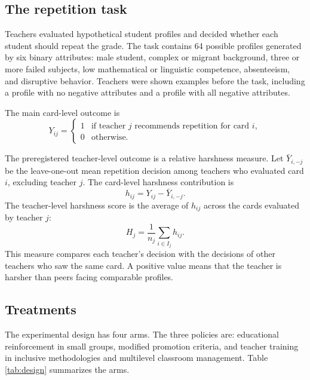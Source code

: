 \documentclass[12pt,a4paper]{article}
\begin{document}
\subsection{The repetition task}

Teachers evaluated hypothetical student profiles and decided whether each student should repeat the grade. The task contains 64 possible profiles generated by six binary attributes: male student, complex or migrant background, three or more failed subjects, low mathematical or linguistic competence, absenteeism, and disruptive behavior. Teachers were shown examples before the task, including a profile with no negative attributes and a profile with all negative attributes.

The main card-level outcome is
\[
Y_{ij} =
\begin{cases}
1 & \text{if teacher } j \text{ recommends repetition for card } i,\\
0 & \text{otherwise}.
\end{cases}
\]

The preregistered teacher-level outcome is a relative harshness measure. Let \(\bar{Y}_{i,-j}\) be the leave-one-out mean repetition decision among teachers who evaluated card \(i\), excluding teacher \(j\). The card-level harshness contribution is
\[
h_{ij}=Y_{ij}-\bar{Y}_{i,-j}.
\]
The teacher-level harshness score is the average of \(h_{ij}\) across the cards evaluated by teacher \(j\):
\[
H_j=\frac{1}{n_j}\sum_{i \in I_j}h_{ij}.
\]
This measure compares each teacher's decision with the decisions of other teachers who saw the same card. A positive value means that the teacher is harsher than peers facing comparable profiles.

\subsection{Treatments}

The experimental design has four arms. The three policies are: educational reinforcement in small groups, modified promotion criteria, and teacher training in inclusive methodologies and multilevel classroom management. Table \ref{tab:design} summarizes the arms.
\end{document}
